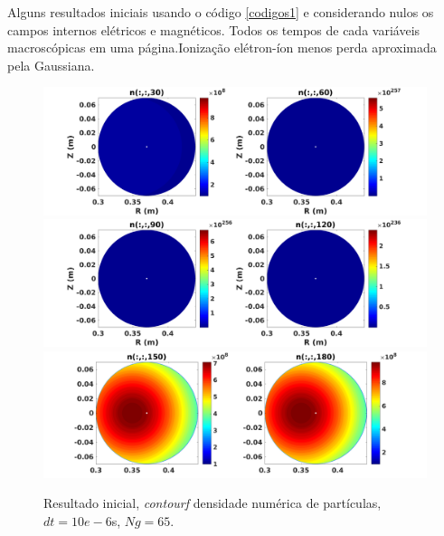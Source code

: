 \begin{frame}

Alguns resultados iniciais usando o código \ref{codigos1} e considerando nulos os campos internos elétricos e magnéticos. Todos os tempos de cada variáveis macroscópicas em uma página.Ionização elétron-íon menos perda aproximada pela Gaussiana.
\begin{figure}[H]
\label{simul201}
\begin{center}
\includegraphics[scale=0.5]{../SImulacao_breakdown/Adaptacao_nova/ntod1.png}  
\includegraphics[scale=0.5]{../SImulacao_breakdown/Adaptacao_nova/ntod2.png} 
\includegraphics[scale=0.5]{../SImulacao_breakdown/Adaptacao_nova/ntod3.png} 
\caption{Resultado inicial, \textit{contourf} densidade numérica de partículas, $dt=10e-6$s, $Ng = 65$.}
\end{center}
\end{figure}


\end{frame}
